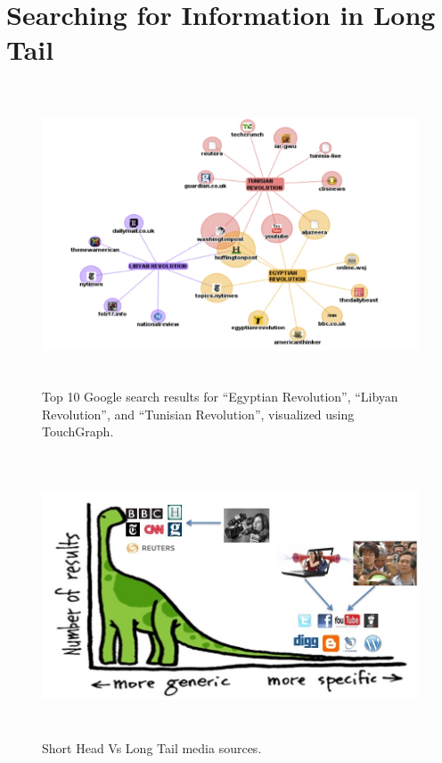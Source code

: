 \section{Searching for Information in Long Tail}

\begin{figure}[htbp]
\centering
\includegraphics[height=3.5in,width=4.5in]{Figures/Chapter3Figures/touchgraph.jpg} 

\caption{Top 10 Google search results for ``Egyptian Revolution'', ``Libyan Revolution'', and ``Tunisian Revolution'', visualized using TouchGraph.}

\label{fg:touchgraph}

\end{figure}

\begin{figure}[htb]
\centering
\includegraphics[height=3.3in,width=4.8in]{Figures/Chapter3Figures/LongTailVsShortHead.jpg} 

\caption{Short Head Vs Long Tail media sources.}

\label{fg:longvsshort}

\end{figure}



